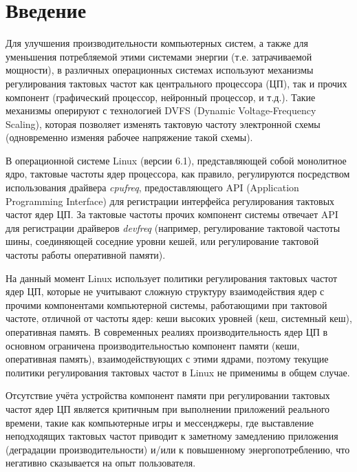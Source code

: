 \section{Введение}
\label{sec:Section0} 

    Для улучшения производительности компьютерных систем, а также для уменьшения потребляемой
    этими системами энергии (т.е. затрачиваемой мощности), в различных операционных системах
    используют механизмы регулирования тактовых частот как центрального процессора (ЦП),
    так и прочих компонент (графический процессор, нейронный процессор, и т.д.). Такие механизмы
    оперируют с технологией DVFS (Dynamic Voltage-Frequency Scaling), которая позволяет изменять
    тактовую частоту электронной схемы (одновременно изменяя рабочее напряжение такой схемы).

    В операционной системе Linux (версии 6.1), представляющей собой монолитное ядро,
    тактовые частоты ядер процессора, как правило, регулируются посредством использования драйвера
    \textit{cpufreq}, предоставляющего API (Application Programming Interface) для регистрации
    интерфейса регулирования тактовых частот ядер ЦП. За тактовые частоты прочих компонент системы
    отвечает API для регистрации драйверов \textit{devfreq} (например, регулирование тактовой частоты шины,
    соединяющей соседние уровни кешей, или регулирование тактовой частоты работы оперативной памяти).

    На данный момент Linux использует политики регулирования тактовых частот ядер ЦП, которые
    не учитывают сложную структуру взаимодействия ядер с прочими компонентами компьютерной системы,
    работающими при тактовой частоте, отличной от частоты ядер: кеши высоких уровней (кеш, системный кеш),
    оперативная память. В современных реалиях производительность ядер ЦП в основном ограничена
    производительностью компонент памяти (кеши, оперативная память), взаимодействующих с этими ядрами,
    поэтому текущие политики регулирования тактовых частот в Linux не применимы в общем случае.

    Отсутствие учёта устройства компонент памяти при регулировании тактовых частот ядер ЦП является
    критичным при выполнении приложений реального времени, такие как компьютерные игры и мессенджеры, где
    выставление неподходящих тактовых частот приводит к заметному замедлению приложения (деградации
    производительности) и/или к повышенному энергопотреблению, что негативно сказывается на
    опыт пользователя.

